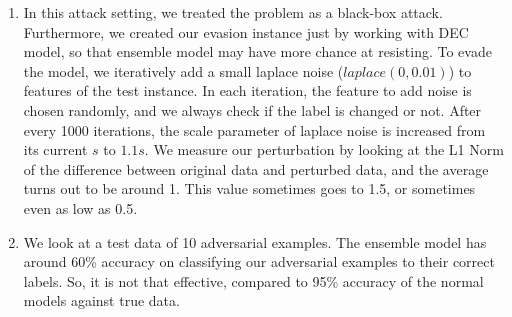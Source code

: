 \documentclass[12pt,reqno]{amsart}
\begin{document}
\begin{enumerate}[label=(\alph*)]
\item In this attack setting, we treated the problem as a black-box attack. Furthermore, we created our evasion instance just by working with DEC model, so that ensemble model may have more chance at resisting. To evade the model, we iteratively add a small laplace noise ($laplace(0, 0.01)$) to features of the test instance. In each iteration, the feature to add noise is chosen randomly, and we always check if the label is changed or not. After every 1000 iterations, the scale parameter of laplace noise is increased from its current $s$ to $1.1s$. We measure our perturbation by looking at the L1 Norm of the difference between original data and perturbed data, and the average turns out to be  around 1. This value sometimes goes to 1.5, or sometimes even as low as 0.5.

\item We look at a test data of 10 adversarial examples. The ensemble model has around 60\% accuracy on classifying our adversarial examples to their correct labels. So, it is not that effective, compared to 95\% accuracy of the normal models against true data.

\end{enumerate}
\end{document}
